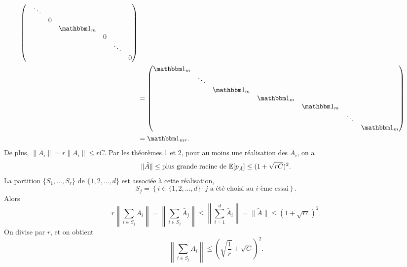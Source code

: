 \begin{preuve}
\begin{align*}
\begin{pmatrix}
        & \ddots & & && \\
        &        & 0 &      & && \\
        &        &   & \un_m & & &\\
        &        &   &      & 0 & & \\
        &        &   &      &   & \ddots & \\
        &        &   &      &   &        & 0
      \end{pmatrix}\\
    &= \begin{pmatrix}
      \un_m &        &    & && \\
        & \ddots & & && \\
        &        & \un_m &      & && \\
        &        &   & \un_m & & &\\
        &        &   &      & \un_m & & \\
        &        &   &      &   & \ddots & \\
        &        &   &      &   &        & \un_m
      \end{pmatrix}\\
    &= \un_{mr}.
  \end{align*}
  De plus, $\|\tilde{A_i}\| = r \|A_i\| \leq rC$. Par les théorèmes 1 et 2, pour au moins une réalisation des
  $\tilde{A_i}$, on a 
  \[ \|\tilde{A}\| \leq \text{plus grande racine de } \mathbb{E}[p_{\tilde{A}}] \leq (1 + \sqrt{rC})^2. \]
  La partition $\{S_1, \ldots, S_r\}$ de $\{1, 2, \ldots, d\}$ est associée à cette réalisation, 
  \[ S_j = \left\{ i \in \{1, 2, \ldots, d\} \cdot j \text{ a été choisi au $i$-ème essai}\right\}. \]
  Alors 
  \[ r \left\| \sum_{i \in S_j}^{}A_i \right\| = \left\| \sum_{i \in S_j}^{} \tilde{A_j} \right\| \leq
    \left\| \sum_{i = 1}^{d} \tilde{A_i}\right\| = \|\tilde{A}\| \leq (1 + \sqrt{rc})^2. \]
  On divise par $r$, et on obtient 
  \[ \left\| \sum_{i \in S_j}^{}A_i \right\| \leq \left( \sqrt{\frac{1}{r}} + \sqrt{C}\right)^2. \]
\end{preuve}












